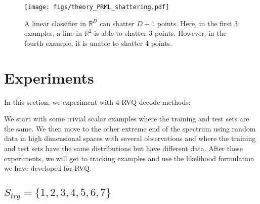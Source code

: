 								\begin{figure}[t]
								\centering
								\texttt{[image: figs/theory\_PRML\_shattering.pdf]}
								\caption{A linear classifier in $\mathbb{R}^D$ can shatter $D+1$ points.  Here, in the first 3 examples, a line in $\mathbb{R}^2$ is able to shatter 3 points.  However, in the fourth example, it is unable to shatter 4 points.}
								\label{fig:shattering}
								\end{figure}


\section{Experiments}
In this section, we experiment with 4 RVQ decode methods:



We start with some trivial scalar examples where the training and test sets are the same.  We then move to the other extreme end of the spectrum using random data in high dimensional spaces with several observations and where the training and test sets have the same distributions but have different data.  After these experiments, we will get to tracking examples and use the likelihood formulation we have developed for RVQ.

\subsection{$S_{trg}=\{1,2,3,4,5,6,7\}$}

